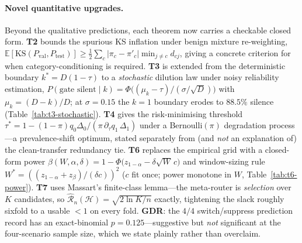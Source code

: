 \documentclass[10pt,conference]{IEEEtran}
\begin{document}
\paragraph{Novel quantitative upgrades.} Beyond the qualitative
predictions, each theorem now carries a checkable closed form.
\textbf{T2} bounds the spurious KS inflation under benign mixture
re-weighting, $\mathbb{E}[\mathrm{KS}(P_{\text{val}},P_{\text{test}})]
\ge \tfrac12\sum_c|\pi_c-\pi'_c|\min_{j\neq c} d_{cj}$, giving a concrete
criterion for when category-conditioning is required. \textbf{T3} is
extended from the deterministic boundary $k^{*}=D(1-\tau)$ to a
\emph{stochastic} dilution law under noisy reliability estimation,
$P(\text{gate silent}\mid k)=\Phi\!\big((\mu_k-\tau)/(\sigma/\sqrt{D})\big)$
with $\mu_k=(D-k)/D$; at $\sigma=0.15$ the $k{=}1$ boundary erodes to
$88.5\%$ silence (Table~\ref{tab:t3-stochastic}). \textbf{T4} gives the
risk-minimising threshold $\tau^{*}=1-(1-\pi)q_0\Delta_0/(\pi\,
\partial_\tau q_1\,\Delta_1)$ under a Bernoulli$(\pi)$ degradation
process---a prevalence-shift optimum, stated separately from (and
\emph{not} an explanation of) the clean-transfer redundancy tie.
\textbf{T6} replaces the empirical grid with a closed-form power
$\beta(W,\alpha,\delta)=1-\Phi\!\big(z_{1-\alpha}-\delta\sqrt{W}\,c\big)$
and window-sizing rule $W^{*}=((z_{1-\alpha}+z_{\beta})/(\delta c))^2$
($c$ fit once; power monotone in $W$, Table~\ref{tab:t6-power}).
\textbf{T7} uses Massart's finite-class lemma---the meta-router is
\emph{selection} over $K$ candidates, so $\hat{\mathcal{R}}_n(\mathcal{H})
=\sqrt{2\ln K/n}$ exactly, tightening the slack roughly sixfold to a
usable $<1$ on every fold. \textbf{GDR}: the $4/4$ switch/suppress
prediction record has an exact-binomial $p=0.125$---suggestive but
\emph{not} significant at the four-scenario sample size, which we state
plainly rather than overclaim.
\end{document}
